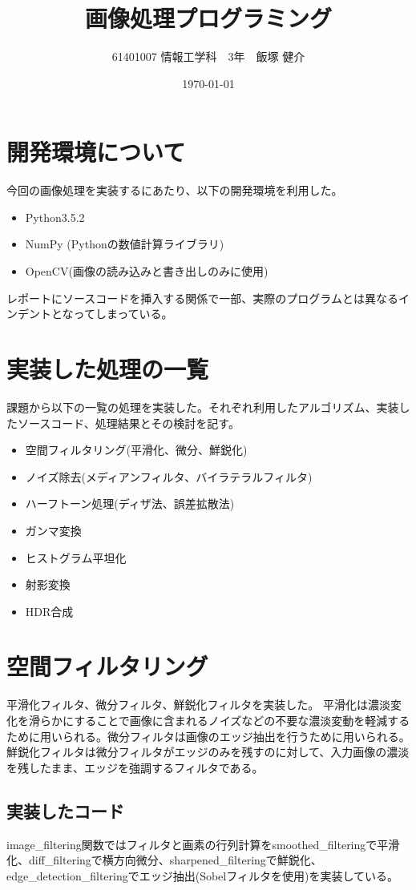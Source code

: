 \documentclass[11pt,a4j]{jsarticle}
\title{画像処理プログラミング}
\author{61401007 情報工学科　3年　飯塚 健介}
\date{\today}
\begin{document}
    \maketitle
    \section{開発環境について}
    今回の画像処理を実装するにあたり、以下の開発環境を利用した。
    \begin{itemize}
        \item Python3.5.2
        \item NumPy (Pythonの数値計算ライブラリ)
        \item OpenCV(画像の読み込みと書き出しのみに使用)
    \end{itemize}
    レポートにソースコードを挿入する関係で一部、実際のプログラムとは異なるインデントとなってしまっている。
    \section{実装した処理の一覧}
    課題から以下の一覧の処理を実装した。それぞれ利用したアルゴリズム、実装したソースコード、処理結果とその検討を記す。
    \begin{itemize}
        \item 空間フィルタリング(平滑化、微分、鮮鋭化)
        \item ノイズ除去(メディアンフィルタ、バイラテラルフィルタ)
        \item ハーフトーン処理(ディザ法、誤差拡散法)
        \item ガンマ変換
        \item ヒストグラム平坦化
        \item 射影変換
        \item HDR合成
    \end{itemize}
    \section{空間フィルタリング}
    平滑化フィルタ、微分フィルタ、鮮鋭化フィルタを実装した。
    平滑化は濃淡変化を滑らかにすることで画像に含まれるノイズなどの不要な濃淡変動を軽減するために用いられる。微分フィルタは画像のエッジ抽出を行うために用いられる。
    鮮鋭化フィルタは微分フィルタがエッジのみを残すのに対して、入力画像の濃淡を残したまま、エッジを強調するフィルタである。
    \subsection{実装したコード}
    image\_filtering関数ではフィルタと画素の行列計算をsmoothed\_filteringで平滑化、diff\_filteringで横方向微分、sharpened\_filteringで鮮鋭化、edge\_detection\_filteringでエッジ抽出(Sobelフィルタを使用)を実装している。
\end{document}
